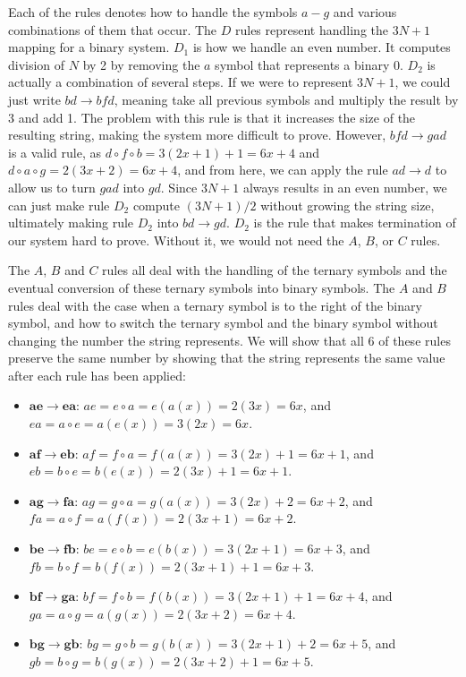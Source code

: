 Each of the rules denotes how to handle the symbols $a-g$ and various combinations of them that occur. The $D$ rules represent handling the $3N+1$ mapping for a binary system. $D_1$ is how we handle an even number. It computes division of $N$ by 2 by removing the $a$ symbol that represents a binary 0. $D_2$ is actually a combination of several steps. If we were to represent $3N+1$, we could just write $bd \rightarrow bfd$, meaning take all previous symbols and multiply the result by 3 and add 1. The problem with this rule is that it increases the size of the resulting string, making the system more difficult to prove. However, $bfd \rightarrow gad$ is a valid rule,  as $d \circ f \circ b = 3(2x+1)+1 = 6x+4$ and $d \circ a \circ g = 2(3x+2) = 6x+4$, and from here, we can apply the rule $ad \rightarrow d$ to allow us to turn $gad$ into $gd$. Since $3N+1$ always results in an even number, we can just make rule $D_2$ compute $(3N+1)/2$ without growing the string size, ultimately making rule $D_2$ into $bd \rightarrow gd$. $D_2$ is the rule that makes termination of our system hard to prove. Without it, we would not need the $A$, $B$, or $C$ rules.\par
The $A$, $B$ and $C$ rules all deal with the handling of the ternary symbols and the eventual conversion of these ternary symbols into binary symbols. The $A$ and $B$ rules deal with the case when a ternary symbol is to the right of the binary symbol, and how to switch the ternary symbol and the binary symbol without changing the number the string represents. We will show that all 6 of these rules preserve the same number by showing that the string represents the same value after each rule has been applied:
\begin{itemize}
    \item $\boldsymbol{ae \rightarrow ea}$: $ae = e \circ a = e(a(x)) = 2(3x) = 6x$, and $ea = a
    \circ e = a(e(x)) = 3(2x) = 6x$.
    \item $\boldsymbol{af \rightarrow eb}$: $af = f \circ a = f(a(x)) = 3(2x)+1 = 6x+1$, and $eb =
    b \circ e = b(e(x)) = 2(3x)+1 = 6x+1$.
    \item $\boldsymbol{ag \rightarrow fa}$: $ag = g \circ a = g(a(x)) = 3(2x)+2 = 6x+2$, and $fa = a \circ f = a(f(x)) = 2(3x+1) = 6x+2$.
    \item $\boldsymbol{be \rightarrow fb}$: $be = e \circ b = e(b(x)) = 3(2x+1) = 6x+3$, and $fb = b \circ f = b(f(x)) = 2(3x+1)+1 = 6x+3$.
    \item $\boldsymbol{bf \rightarrow ga}$: $bf = f \circ b = f(b(x)) = 3(2x+1)+1 = 6x+4$, and $ga =  a \circ g = a(g(x)) = 2(3x+2) = 6x+4$.
    \item $\boldsymbol{bg \rightarrow gb}$: $bg = g \circ b = g(b(x)) = 3(2x+1)+2 = 6x+5$, and $gb = b \circ g = b(g(x)) = 2(3x+2)+1 = 6x+5$.
\end{itemize}
